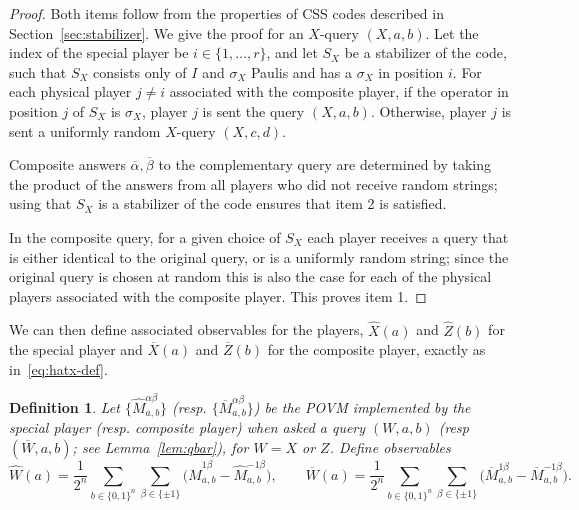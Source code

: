 \documentclass[11pt,letterpaper]{article}
\newcommand{\<}{\langle}
\renewcommand{\>}{\rangle}
\newtheorem{definition}[theorem]{Definition}
\begin{document}
\begin{proof}
  Both items follow from the properties of CSS codes described in Section~\ref{sec:stabilizer}. We give the proof for an
  $X$-query $(X, a, b)$. Let the index
  of the special player be $i\in\{1,\ldots,r\}$, and let $S_X$ be a stabilizer
  of the code, such that $S_X$ consists only of $I$ and $\sigma_X$ Paulis and has a $\sigma_X$ in
  position $i$. For each physical
  player $j \neq i$ associated with the composite player, if the operator in
  position $j$ of $S_X$ is $\sigma_X$,  player $j$ is sent the query $(X,
  a, b)$. Otherwise, player $j$ is sent a uniformly random $X$-query
  $(X, c, d)$.
	
		Composite answers $\overline{\alpha},\overline{\beta}$ to the complementary
    query are determined by taking the product of the answers from all
    players who did not receive random strings; using that $S_X$ is a stabilizer of the code  ensures that item 2 is satisfied. 
	
	In the composite query, for a given choice of $S_X$ each player
  receives a query that is either identical to the original query, or
  is a uniformly random string; since the original query is chosen at random this is also the case for each of the physical players associated with the composite player. This proves item 1.
\end{proof}

We can then define associated observables for the players, $\hat{X}(a)$ and $\hat{Z}(b)$ for the special player and $\overline{X}(a)$ and $\overline{Z}(b)$ for the composite player, exactly as in~\eqref{eq:hatx-def}. 

\begin{definition}\label{def:ol-obs}
Let $\{\hat{M}_{a,b}^{\alpha\beta}\}$ (resp. $\{\overline{M}_{a,b}^{\alpha\beta}\}$) be the POVM implemented by the special player (resp. composite player) when asked a query $(W,a,b)$ (resp $(\overline{W},a,b)$; see Lemma~\ref{lem:qbar}), for $W=X$ or $Z$. Define observables
\begin{equation*}
\hat{W}(a) = \frac{1}{2^n}\sum_{b\in\{0,1\}^n} \sum_{\beta\in \{\pm1\}} \big(\hat{M}_{a,b}^{1\beta}-\hat{M}_{a,b}^{-1\beta}\big), \qquad \overline{W}(a) = \frac{1}{2^n}\sum_{b\in\{0,1\}^n} \sum_{\beta\in \{\pm1\}} \big(\overline{M}_{a,b}^{1\beta}-\overline{M}_{a,b}^{-1\beta}\big).
\end{equation*}
\end{definition}
\end{document}
